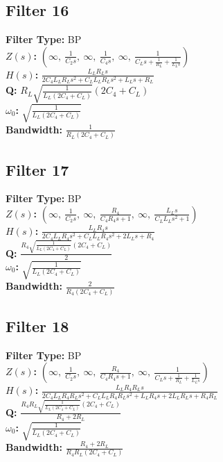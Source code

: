 \documentclass{article}
\begin{document}
\subsection*{Filter 16}
\textbf{Filter Type:} BP \\ 
\textbf{$Z(s)$:} $\left( \infty, \  \frac{1}{C_{2} s}, \  \infty, \  \frac{1}{C_{4} s}, \  \infty, \  \frac{1}{C_{L} s + \frac{1}{R_{L}} + \frac{1}{L_{L} s}}\right)$ \\ 
\textbf{$H(s)$:} $\frac{L_{L} R_{L} s}{2 C_{4} L_{L} R_{L} s^{2} + C_{L} L_{L} R_{L} s^{2} + L_{L} s + R_{L}}$ \\ 
\textbf{Q:} $R_{L} \sqrt{\frac{1}{L_{L} \left(2 C_{4} + C_{L}\right)}} \left(2 C_{4} + C_{L}\right)$ \\ 
\textbf{$\omega_0$:} $\sqrt{\frac{1}{L_{L} \left(2 C_{4} + C_{L}\right)}}$ \\ 
\textbf{Bandwidth:} $\frac{1}{R_{L} \left(2 C_{4} + C_{L}\right)}$ \\ 
\subsection*{Filter 17}
\textbf{Filter Type:} BP \\ 
\textbf{$Z(s)$:} $\left( \infty, \  \frac{1}{C_{2} s}, \  \infty, \  \frac{R_{4}}{C_{4} R_{4} s + 1}, \  \infty, \  \frac{L_{L} s}{C_{L} L_{L} s^{2} + 1}\right)$ \\ 
\textbf{$H(s)$:} $\frac{L_{L} R_{4} s}{2 C_{4} L_{L} R_{4} s^{2} + C_{L} L_{L} R_{4} s^{2} + 2 L_{L} s + R_{4}}$ \\ 
\textbf{Q:} $\frac{R_{4} \sqrt{\frac{1}{L_{L} \left(2 C_{4} + C_{L}\right)}} \left(2 C_{4} + C_{L}\right)}{2}$ \\ 
\textbf{$\omega_0$:} $\sqrt{\frac{1}{L_{L} \left(2 C_{4} + C_{L}\right)}}$ \\ 
\textbf{Bandwidth:} $\frac{2}{R_{4} \left(2 C_{4} + C_{L}\right)}$ \\ 
\subsection*{Filter 18}
\textbf{Filter Type:} BP \\ 
\textbf{$Z(s)$:} $\left( \infty, \  \frac{1}{C_{2} s}, \  \infty, \  \frac{R_{4}}{C_{4} R_{4} s + 1}, \  \infty, \  \frac{1}{C_{L} s + \frac{1}{R_{L}} + \frac{1}{L_{L} s}}\right)$ \\ 
\textbf{$H(s)$:} $\frac{L_{L} R_{4} R_{L} s}{2 C_{4} L_{L} R_{4} R_{L} s^{2} + C_{L} L_{L} R_{4} R_{L} s^{2} + L_{L} R_{4} s + 2 L_{L} R_{L} s + R_{4} R_{L}}$ \\ 
\textbf{Q:} $\frac{R_{4} R_{L} \sqrt{\frac{1}{L_{L} \left(2 C_{4} + C_{L}\right)}} \left(2 C_{4} + C_{L}\right)}{R_{4} + 2 R_{L}}$ \\ 
\textbf{$\omega_0$:} $\sqrt{\frac{1}{L_{L} \left(2 C_{4} + C_{L}\right)}}$ \\ 
\textbf{Bandwidth:} $\frac{R_{4} + 2 R_{L}}{R_{4} R_{L} \left(2 C_{4} + C_{L}\right)}$ \\ 
\end{document}
